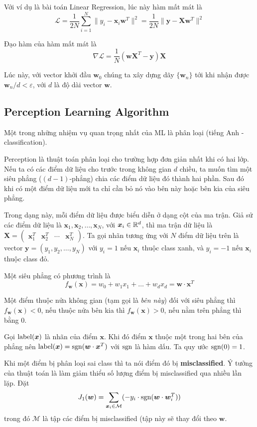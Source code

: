 Với ví dụ là bài toán Linear Regression, lúc này hàm mất mát là \[\mathcal{L} = \dfrac{1}{2N} \sum_{i=1}^N \lVert y_i - \bm{x}_i \bm{w}^T \rVert^2 = \dfrac{1}{2N} \lVert \bm{y} - \bm{X} \bm{w}^T \rVert^2\]

Đạo hàm của hàm mất mát là \[\nabla \mathcal{L} = \dfrac{1}{N} (\bm{w} \bm{X}^T - \bm{y}) \bm{X}\]

Lúc này, với vector khởi đầu $\bm{w}_0$ chúng ta xây dựng dãy $\{ \bm{w}_n \}$ tới khi nhận được $\bm{w}_n / d < \varepsilon$, với $d$ là độ dài vector $\bm{w}$.

\subsection*{Perception Learning Algorithm}

Một trong những nhiệm vụ quan trọng nhất của ML là phân loại (tiếng Anh - classification).

Perception là thuật toán phân loại cho trường hợp đơn giản nhất khi có hai lớp. Nếu ta có các điểm dữ liệu cho trước trong không gian $d$ chiều, ta muốn tìm một siêu phẳng ($(d-1)$-phẳng) chia các điểm dữ liệu đó thành hai phần. Sau đó khi có một điểm dữ liệu mới ta chỉ cần bỏ nó vào bên này hoặc bên kia của siêu phẳng.

Trong dạng này, mỗi điểm dữ liệu được biểu diễn ở dạng cột của ma trận. Giả sử các điểm dữ liệu là $\bm{x}_1, \bm{x}_2, \ldots, \bm{x}_N$, với $\bm{x}_i \in \mathbb{R}^d$, thì ma trận dữ liệu là $\bm{X} = \begin{pmatrix}
    \bm{x}_1^T & \bm{x}_2^T & \cdots & \bm{x}_N^T
\end{pmatrix}$. Ta gọi nhãn tương ứng với $N$ điểm dữ liệu trên là vector $\bm{y} = (y_1, y_2, \ldots, y_N)$ với $y_i = 1$ nếu $\bm{x}_i$ thuộc class xanh, và $y_i = -1$ nếu $\bm{x}_i$ thuộc class đỏ.

Một siêu phẳng có phương trình là \[ f_{\bm{w}} (\bm{x}) = w_0 + w_1 x_1 + \ldots + w_d x_d = \bm{w} \cdot \bm{x}^T\]

Một điểm thuộc nửa không gian (tạm gọi là \textit{bên này}) đối với siêu phẳng thì $f_{\bm{w}} (\bm{x}) < 0$, nếu thuộc nửa bên kia thì $f_{\bm{w}} (\bm{x}) > 0$, nếu nằm trên phẳng thì bằng 0.

Gọi $\operatorname{label} (\bm{x})$ là nhãn của điểm $\bm{x}$. Khi đó điểm $\bm{x}$ thuộc một trong hai bên của phẳng nên $\operatorname{label} (\bm{x}) = \operatorname{sgn}(\bm{w} \cdot \bm{x}^T)$ với $\operatorname{sgn}$ là hàm dấu. Ta quy ước $\operatorname{sgn}(0) = 1$.

Khi một điểm bị phân loại sai class thì ta nói điểm đó bị \textbf{misclassified}. Ý tưởng của thuật toán là làm giảm thiểu số lượng điểm bị misclassified qua nhiều lần lặp. Đặt \[ J_1 (\bm{w}) = \sum_{\bm{x}_i \in \mathcal{M}} (-y_i \cdot \operatorname{sgn} (\bm{w} \cdot \bm{w}_i^T)) \] trong đó $\mathcal{M}$ là tập các điểm bị misclassified (tập này sẽ thay đổi theo $\bm{w}$.

